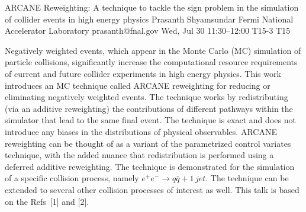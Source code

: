 \begin{talk}
  {ARCANE Reweighting: A technique to tackle the sign problem in the simulation of collider events in high energy physics}%
  {Prasanth Shyamsundar}%
  {Fermi National Accelerator Laboratory}%
  {prasanth@fnal.gov}%
  {}%
  {}%
  {Wed, Jul 30 11:30–12:00}%
  {T15-3}%
  {T15}%
  {}%
  
				
			

Negatively weighted events, which appear in the Monte Carlo (MC) simulation of particle collisions, significantly increase the computational resource requirements of current and future collider experiments in high energy physics. This work introduces an MC technique called ARCANE reweighting for reducing or eliminating negatively weighted events. The technique works by redistributing (via an additive reweighting) the contributions of different pathways within the simulator that lead to the same final event. The technique is exact and does not introduce any biases in the distributions of physical observables. ARCANE reweighting can be thought of as a variant of the parametrized control variates technique, with the added nuance that redistribution is performed using a deferred additive reweighting. The technique is demonstrated for the simulation of a specific collision process, namely $e^+ e^- \longrightarrow q \bar{q} + 1\,jet$. The technique can be extended to several other collision processes of interest as well. This talk is based on the Refs~[1] and [2].

\medskip


\end{talk}
